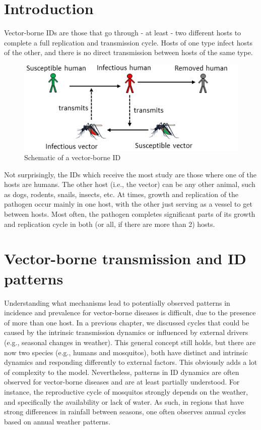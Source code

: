 \documentclass[]{book}
\theoremstyle{definition}
\theoremstyle{definition}
\theoremstyle{definition}
\theoremstyle{remark}
\begin{document}
\section{Introduction}\label{introduction-7}

Vector-borne IDs are those that go through - at least - two different
hosts to complete a full replication and transmission cycle. Hosts of
one type infect hosts of the other, and there is no direct transmission
between hosts of the same type.

\begin{figure}
\centering
\includegraphics{./images/vectorborne-schematic.png}
\caption{Schematic of a vector-borne ID}
\end{figure}

Not surprisingly, the IDs which receive the most study are those where
one of the hosts are humans. The other host (i.e., the vector) can be
any other animal, such as dogs, rodents, snails, insects, etc. At times,
growth and replication of the pathogen occur mainly in one host, with
the other just serving as a vessel to get between hosts. Most often, the
pathogen completes significant parts of its growth and replication cycle
in both (or all, if there are more than 2) hosts.

\section{Vector-borne transmission and ID
patterns}\label{vector-borne-transmission-and-id-patterns}

Understanding what mechanisms lead to potentially observed patterns in
incidence and prevalence for vector-borne diseases is difficult, due to
the presence of more than one host. In a previous chapter, we discussed
cycles that could be caused by the intrinsic transmission dynamics or
influenced by external drivers (e.g., seasonal changes in weather). This
general concept still holds, but there are now two species (e.g., humans
and mosquitos), both have distinct and intrinsic dynamics and responding
differently to external factors. This obviously adds a lot of complexity
to the model. Nevertheless, patterns in ID dynamics are often observed
for vector-borne diseases and are at least partially understood. For
instance, the reproductive cycle of mosquitos strongly depends on the
weather, and specifically the availability or lack of water. As such, in
regions that have strong differences in rainfall between seasons, one
often observes annual cycles based on annual weather patterns.
\end{document}
